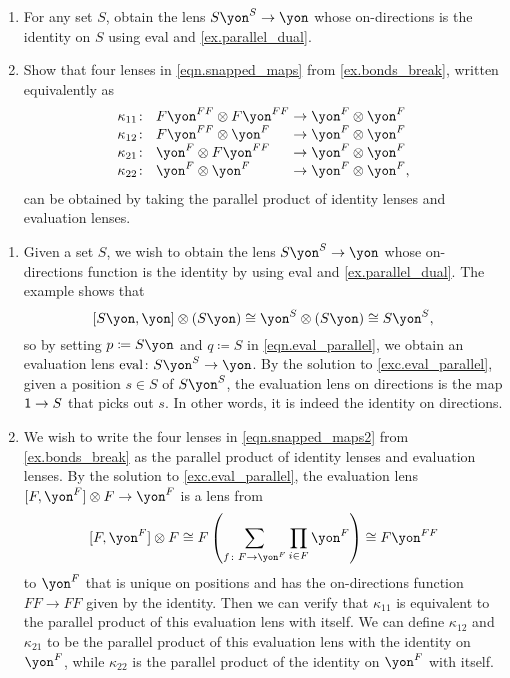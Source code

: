 \documentclass[Book-Poly]{subfiles}
\begin{document}
\begin{exercise}
\begin{enumerate}
	\item For any set $S$, obtain the lens $S\yon^S\to\yon$ whose on-directions  is the identity on $S$ using eval and \cref{ex.parallel_dual}.
	\item Show that four lenses in \eqref{eqn.snapped_maps} from \cref{ex.bonds_break}, written equivalently as
	\begin{equation} \label{eqn.snapped_maps2}
	\arraycolsep=1.4pt
    \begin{array}{lll}
    	\kappa_{11}\colon&~ F\yon^{FF}\otimes F\yon^{FF}&\to\yon^F\otimes\yon^F\\
    	\kappa_{12}\colon&~ F\yon^{FF}\otimes \yon^F&\to\yon^F\otimes\yon^F\\
    	\kappa_{21}\colon&~ \yon^F\otimes F\yon^{FF}&\to\yon^F\otimes\yon^F\\
    	\kappa_{22}\colon&~ \yon^F\otimes\yon^F&\to\yon^F\otimes\yon^F,
    \end{array}
	\end{equation}
	can be obtained by taking the parallel product of identity lenses and evaluation lenses.
\qedhere
\end{enumerate}
\begin{solution}
\begin{enumerate}
    \item Given a set $S$, we wish to obtain the lens $S\yon^S \to \yon$ whose on-directions function is the identity by using eval and \cref{ex.parallel_dual}.
    The example shows that
    \[
        \ihom{S\yon, \yon} \otimes (S\yon) \iso \yon^S \otimes (S\yon) \iso S\yon^S,
    \]
    so by setting $p \coloneqq S\yon$ and $q \coloneqq S$ in \eqref{eqn.eval_parallel}, we obtain an evaluation lens $\fun{eval} \colon S\yon^S \to \yon$.
    By the solution to \cref{exc.eval_parallel}, given a position $s \in S$ of $S\yon^S$, the evaluation lens on directions is the map $\textsf{1} \to S$ that picks out $s$.
    In other words, it is indeed the identity on directions.
    \item We wish to write the four lenses in \eqref{eqn.snapped_maps2} from \cref{ex.bonds_break} as the parallel product of identity lenses and evaluation lenses.
    By the solution to \cref{exc.eval_parallel}, the evaluation lens $\ihom{F,\yon^F}\otimes F\to\yon^F$
    is a lens from
    \[
        \ihom{F,\yon^F}\otimes F\iso F\left(\sum_{f\colon F\to\yon^F}\prod_{i\in F}\yon^F\right)\iso F\yon^{FF}
    \]
    to $\yon^F$ that is unique on positions and has the on-directions function $FF\to FF$ given by the identity.
    Then we can verify that $\kappa_{11}$ is equivalent to the parallel product of this evaluation lens with itself.
    We can define $\kappa_{12}$ and $\kappa_{21}$ to be the parallel product of this evaluation lens with the identity on $\yon^F$, while $\kappa_{22}$ is the parallel product of the identity on $\yon^F$ with itself.
\end{enumerate}
\end{solution}
\end{exercise}
\end{document}
